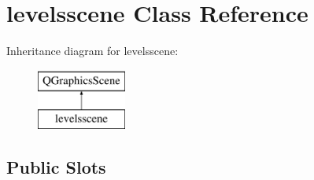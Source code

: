 \hypertarget{classlevelsscene}{\section{levelsscene Class Reference}
\label{classlevelsscene}
}
Inheritance diagram for levelsscene\-:\begin{figure}[H]
\begin{center}
\leavevmode
\includegraphics[height=2.000000cm]{classlevelsscene}
\end{center}
\end{figure}
\subsection*{Public Slots}

